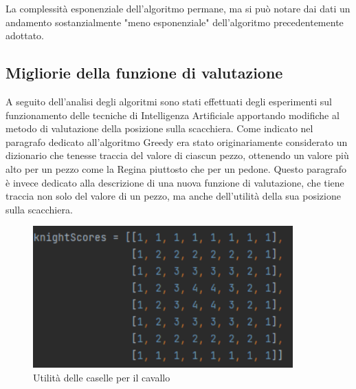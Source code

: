 La complessità esponenziale dell'algoritmo permane, ma si può notare dai dati un andamento sostanzialmente "meno esponenziale" dell'algoritmo precedentemente adottato.

\subsection{Migliorie della funzione di valutazione}
A seguito dell'analisi degli algoritmi sono stati effettuati degli esperimenti sul funzionamento delle tecniche di Intelligenza Artificiale apportando modifiche al metodo di valutazione della posizione sulla scacchiera. Come indicato nel paragrafo dedicato all'algoritmo Greedy era stato originariamente considerato un dizionario che tenesse traccia del valore di ciascun pezzo, ottenendo un valore più alto per un pezzo come la Regina piuttosto che per un pedone. Questo paragrafo è invece dedicato alla descrizione di una nuova funzione di valutazione, che tiene traccia non solo del valore di un pezzo, ma anche dell'utilità della sua posizione sulla scacchiera.

\begin{figure}[!htb]
    \includegraphics[width=10cm]{frontmatter/figure/cavallo.pdf}
    \centering
    \caption{Utilità delle caselle per il cavallo}
    \label{fig:valore_pezzi}
\end{figure}


